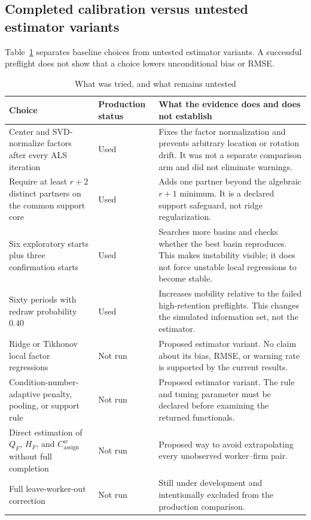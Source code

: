 \documentclass[11pt]{article}
\newcommand{\QF}{Q_F}
\newcommand{\HF}{H_F}
\newcommand{\Cassign}{C^{w}_{\mathrm{assign}}}
\begin{document}
\subsection{Completed calibration versus untested estimator variants}

Table~\ref{tab:variants} separates baseline choices from untested estimator
variants.  A successful preflight does not show that a choice lowers
unconditional bias or RMSE.

\begin{table}[H]
\centering
\small
\caption{What was tried, and what remains untested}
\label{tab:variants}
\begin{tabularx}{\textwidth}{@{}p{}p{}X@{}}
\toprule
Choice & Production status & What the evidence does and does not establish \\
\midrule
Center and SVD-normalize factors after every ALS iteration
& Used
& Fixes the factor normalization and prevents arbitrary location or rotation
drift.  It was not a separate comparison arm and did not eliminate warnings. \\
Require at least $r+2$ distinct partners on the common support core
& Used
& Adds one partner beyond the algebraic $r+1$ minimum.  It is a declared
support safeguard, not ridge regularization. \\
Six exploratory starts plus three confirmation starts
& Used
& Searches more basins and checks whether the best basin reproduces.  This
makes instability visible; it does not force unstable local regressions to
become stable. \\
Sixty periods with redraw probability $0.40$
& Used
& Increases mobility relative to the failed high-retention preflights.  This
changes the simulated information set, not the estimator. \\
Ridge or Tikhonov local factor regressions
& Not run
& Proposed estimator variant.  No claim about its bias, RMSE, or warning rate
is supported by the current results. \\
Condition-number-adaptive penalty, pooling, or support rule
& Not run
& Proposed estimator variant.  The rule and tuning parameter must be declared
before examining the returned functionals. \\
Direct estimation of $\QF$, $\HF$, and $\Cassign$ without full completion
& Not run
& Proposed way to avoid extrapolating every unobserved worker--firm pair. \\
Full leave-worker-out correction
& Not run
& Still under development and intentionally excluded from the production
comparison. \\
\bottomrule
\end{tabularx}
\end{table}
\end{document}
